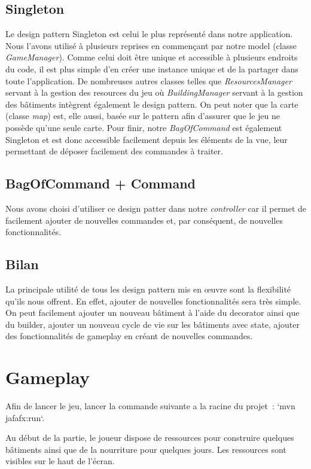 \documentclass{article}
\begin{document}
\subsection{Singleton}
Le design pattern Singleton est celui le plus représenté dans notre application. Nous l'avons utilisé à plusieurs reprises en commençant par
notre model (classe \textit{GameManager}). Comme celui doit être unique et accessible à plusieurs endroits du code, il est plus simple d'en créer 
une instance unique et de la partager dans toute l'application. De nombreuses autres classes telles que \textit{ResourcesManager} servant à la gestion
des resources du jeu où \textit{BuildingManager} servant à la gestion des bâtiments intègrent également le design pattern. On peut noter que la carte 
(classe \textit{map}) est, elle aussi, basée sur le pattern afin d'assurer que le jeu ne possède qu'une seule carte. Pour finir, notre \textit{BagOfCommand}
est également Singleton et est donc accessible facilement depuis les éléments de la vue, leur permettant de déposer facilement des commandes à traiter.

\subsection{BagOfCommand + Command}
Nous avons choisi d'utiliser ce design patter dans notre \textit{controller} car il permet de facilement ajouter de nouvelles commandes et, par conséquent,
de nouvelles fonctionnalités. 

\subsection{Bilan}
La principale utilité de tous les design pattern mis en œuvre sont la flexibilité qu'ils nous offrent. En effet, ajouter de nouvelles fonctionnalités sera
très simple. On peut facilement ajouter un nouveau bâtiment à l'aide du decorator ainsi que du builder, ajouter un nouveau cycle de vie sur les bâtiments 
avec state, ajouter des fonctionnalités de gameplay en créant de nouvelles commandes.

\section{Gameplay}

Afin de lancer le jeu, lancer la commande suivante a la racine du projet : `mvn jafafx:run`.


Au début de la partie, le joueur dispose de ressources pour construire quelques bâtiments ainsi
que de la nourriture pour quelques jours. Les ressources sont visibles sur le haut de l'écran.
\end{document}
